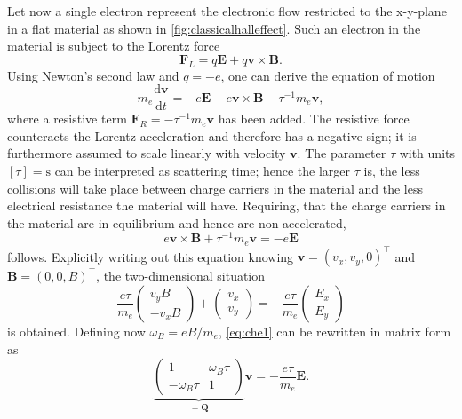 \documentclass{report}
\numberwithin{tm}{section}
\newcommand\matr[1]{\ensuremath{\boldsymbol{\mathbf{#1}}}}
\newcommand\vect[1]{\ensuremath{\bm{#1}}}
\begin{document}
	Let now a single electron represent the electronic flow restricted to the x-y-plane in a flat material as shown in \cref{fig:classicalhalleffect}. Such an electron in the material is subject to the Lorentz force \begin{equation}
		\vect{F}_L = q\vect{E} + q\vect{v}\times\vect{B}.
	\end{equation} Using Newton's second law and $q=-e$, one can derive the equation of motion \begin{equation}
	m_e\frac{\mathrm{d}\vect{v}}{\mathrm{d}t} = -e\vect{E} - e\vect{v}\times \vect{B} - \tau^{-1}m_e\vect{v},
	\end{equation} where a resistive term $\vect{F}_R = -\tau^{-1} m_e\vect{v}$ has been added. The resistive force counteracts the Lorentz acceleration and therefore has a negative sign; it is furthermore assumed to scale linearly with velocity $\vect{v}$. The parameter $\tau$ with units $[\tau] = \si{\second}$ can be interpreted as scattering time; hence the larger $\tau$ is, the less collisions will take place between charge carriers in the material and the less electrical resistance the material will have. Requiring, that the charge carriers in the material are in equilibrium and hence are non-accelerated, \begin{equation}\label{eq:che_equilibriumcondition}
	e\vect{v}\times \vect{B} + \tau^{-1}m_e\vect{v} = -e\vect{E}
	\end{equation} follows. Explicitly writing out this equation knowing $\vect{v} = (v_x, v_y, 0)^\top$ and $\vect{B} = (0,0,B)^\top$, the two-dimensional situation \begin{equation}\label{eq:che1}
	\frac{e\tau}{m_e}\begin{pmatrix}
		v_y B \\ -v_x B
	\end{pmatrix} + \begin{pmatrix}
	v_x \\ v_y
	\end{pmatrix} = -\frac{e\tau}{m_e}\begin{pmatrix}
	E_x \\ E_y
	\end{pmatrix}
	\end{equation} is obtained. Defining now $\omega_B = eB/m_e$, \cref{eq:che1} can be rewritten in matrix form as \begin{equation}
	\underbrace{\begin{pmatrix}
		1 & \omega_B\tau \\ -\omega_B\tau & 1
	\end{pmatrix}}_{\doteq \matr{Q}}\vect{v} = -\frac{e\tau}{m_e}\vect{E}.

\end{equation}
\end{document}

